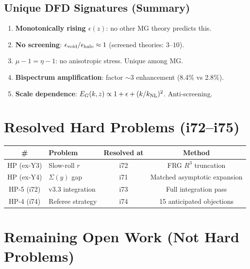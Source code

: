 \documentclass[11pt,a4paper]{article}
\begin{document}
\subsection{Unique DFD Signatures (Summary)}
\begin{enumerate}[nosep]
\item \textbf{Monotonically rising $\epsilon(z)$}: no other MG theory predicts this.
\item \textbf{No screening}: $\epsilon_{\rm void}/\epsilon_{\rm halo} \approx 1$ (screened theories: $3$--$10$).
\item \textbf{$\mu - 1 = \eta - 1$}: no anisotropic stress. Unique among MG.
\item \textbf{Bispectrum amplification}: factor $\sim 3$ enhancement (8.4\% vs 2.8\%).
\item \textbf{Scale dependence}: $E_G(k,z) \propto 1 + \epsilon + (k/k_{\rm NL})^2$. Anti-screening.
\end{enumerate}

\section{Resolved Hard Problems (i72--i75)}

\begin{center}
\begin{tabular}{clcc}
\toprule
\textbf{\#} & \textbf{Problem} & \textbf{Resolved at} & \textbf{Method} \\
\midrule
HP (ex-Y3) & Slow-roll $r$ & i72 & FRG $R^3$ truncation \\
HP (ex-Y4) & $\Sigma(y)$ gap & i71 & Matched asymptotic expansion \\
HP-5 (i72) & v3.3 integration & i73 & Full integration pass \\
HP-4 (i74) & Referee strategy & i74 & 15 anticipated objections \\
\bottomrule
\end{tabular}
\end{center}

\section{Remaining Open Work (Not Hard Problems)}
\end{document}
